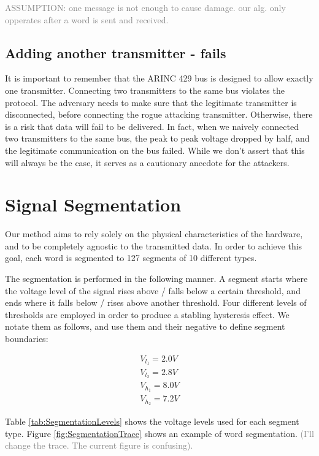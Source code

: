 \documentclass[conference]{IEEEtran}
\begin{document}
  \textcolor{gray}{ASSUMPTION: one message is not enough to cause damage. our alg. only opperates after a word is sent and received.}

\subsection{Adding another transmitter - fails}
  It is important to remember that the ARINC 429 bus is designed to allow exactly one transmitter. Connecting two transmitters to the same bus violates the protocol. The adversary needs to make sure that the legitimate transmitter is disconnected, before connecting the rogue attacking transmitter. Otherwise, there is a risk that data will fail to be delivered. In fact, when we naively connected two transmitters to the same bus, the peak to peak voltage dropped by half, and the legitimate communication on the bus failed. While we don't assert that this will always be the case, it serves as a cautionary anecdote for the attackers.

\section{Signal Segmentation}
  Our method aims to rely solely on the physical characteristics of the hardware, and to be completely agnostic to the transmitted data. In order to achieve this goal, each word is segmented to 127 segments of 10 different types.
  
  The segmentation is performed in the following manner. A segment starts where the voltage level of the signal rises above / falls below a certain threshold, and ends where it falls below / rises above another threshold. Four different levels of thresholds are employed in order to produce a stabling hysteresis effect. We notate them as follows, and use them and their negative to define segment boundaries:
  
  \begin{align*}
    V_{l_1} = 2.0V \\
    V_{l_2} = 2.8V \\
    V_{h_1} = 8.0V \\
    V_{h_2} = 7.2V 
  \end{align*}
  
  Table \ref{tab:SegmentationLevels} shows the voltage levels used for each segment type. Figure \ref{fig:SegmentationTrace} shows an example of word segmentation. \textcolor{gray}{(I'll change the trace. The current figure is confusing).}
  
\end{document}
